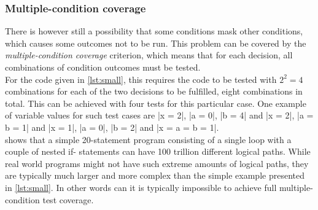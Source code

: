 \subsubsection{Multiple-condition coverage}

There is however still a possibility that some conditions mask other
conditions, which causes some outcomes not to be run. This problem can
be covered by the \emph{multiple-condition coverage} criterion, which
means that for each decision, all combinations of condition outcomes
must be tested.\\

For the code given in \ref{lst:small}, this requires the code to be
tested with $2^2 = 4$ combinations for each of the two decisions to be
fulfilled, eight combinations in total. This can be achieved with four
tests for this particular case. One example of variable values for
such test cases are |x = 2|, |a = 0|, |b = 4| and |x = 2|, |a = b = 1|
and |x = 1|, |a = 0|, |b = 2| and |x = a = b = 1|.\\

\citeauthor{book:art_of_testing} shows that a simple 20-statement
program consisting of a single loop with a couple of nested if-
statements can have 100 trillion different logical paths. While real
world programs might not have such extreme amounts of logical paths,
they are typically much larger and more complex than the simple example
presented in \ref{lst:small}. In other words can it is typically
impossible to achieve full multiple-condition test coverage.\\
